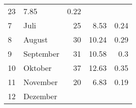 \begin{longtable}{lXrrr}
       \num{23} &
       \num[round-mode=places,round-precision=2]{7.85} &
         \num[round-mode=places,round-precision=2]{0.22} \\

     7 &
     \multicolumn{1}{X}{ Juli   } &


       \num{25} &
       \num[round-mode=places,round-precision=2]{8.53} &
         \num[round-mode=places,round-precision=2]{0.24} \\

     8 &
     \multicolumn{1}{X}{ August   } &


       \num{30} &
       \num[round-mode=places,round-precision=2]{10.24} &
         \num[round-mode=places,round-precision=2]{0.29} \\

     9 &
     \multicolumn{1}{X}{ September   } &


       \num{31} &
       \num[round-mode=places,round-precision=2]{10.58} &
         \num[round-mode=places,round-precision=2]{0.3} \\

     10 &
     \multicolumn{1}{X}{ Oktober   } &


       \num{37} &
       \num[round-mode=places,round-precision=2]{12.63} &
         \num[round-mode=places,round-precision=2]{0.35} \\

     11 &
     \multicolumn{1}{X}{ November   } &


       \num{20} &
       \num[round-mode=places,round-precision=2]{6.83} &
         \num[round-mode=places,round-precision=2]{0.19} \\

     12 &
     \multicolumn{1}{X}{ Dezember   } &



\end{longtable}
